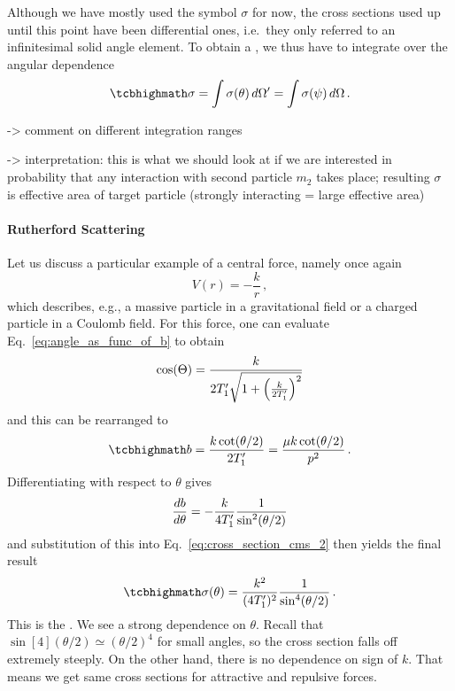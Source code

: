 \documentclass[../class_mech_main.tex]{subfiles}
\begin{document}
Although we have mostly used the symbol $\sigma$ for now, the cross sections used up until this point have been differential ones, i.e.~they only referred to an infinitesimal solid angle element. To obtain a , we thus have to integrate over the angular dependence
\begin{equation}
	\eqbox{
		\sigma = \int \sigma(\theta) \, d\Omega' = \int \sigma(\psi) \, d\Omega
	}
	\, .
\end{equation}

-> comment on different integration ranges

-> interpretation: this is what we should look at if we are interested in probability that any interaction with second particle $m_2$ takes place; resulting $\sigma$ is effective area of target particle (strongly interacting = large effective area)






			\paragraph{Rutherford Scattering}
Let us discuss a particular example of a central force, namely once again
\begin{equation*}
	V(r) = - \frac{k}{r} \, ,
\end{equation*}
which describes, e.g., a massive particle in a gravitational field or a charged particle in a Coulomb field. For this force, one can evaluate Eq.~\eqref{eq:angle_as_func_of_b} to obtain
\begin{equation}
	\cos(\Theta) = \frac{k}{2 T'_1 \sqrt{1 + \qty(\frac{k}{2 T'_1})^2}}
\end{equation}
and this can be rearranged to
\begin{equation}
	\eqbox{
		b = \frac{k \cot(\theta/2)}{2 T'_1} = \frac{\mu k \cot(\theta/2)}{p^2}
	}
	\,. 
\end{equation}
Differentiating with respect to $\theta$ gives
\begin{equation}
	\dv{b}{\theta} = - \frac{k}{4 T'_1} \frac{1}{\sin[2](\theta/2)}
\end{equation}
and substitution of this into Eq.~\eqref{eq:cross_section_cms_2} then yields the final result
\begin{equation}\label{eq:rutherford_scat}
	\eqbox{
		\sigma(\theta) = \frac{k^2}{(4 T'_1)^2} \frac{1}{\sin[4](\theta/2)}
	}
	\, .
\end{equation}
This is the . We see a strong dependence on $\theta$. Recall that $\sin[4](\theta/2) \simeq (\theta/2)^4$ for small angles, so the cross section falls off extremely steeply. On the other hand, there is no dependence on sign of $k$. That means we get same cross sections for attractive and repulsive forces.
\end{document}

